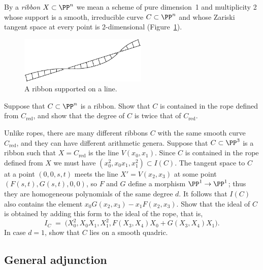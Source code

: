 \begin{definition}
By a \emph{ribbon} $X \subset \PP^n$ we mean a scheme of pure dimension~1
%
and multiplicity 2 whose support is a smooth, irreducible curve $C \subset
\PP^n$ and whose 
Zariski tangent space
%
 at every point is 2-dimensional
(Figure~\ref{Fig15.3}).
\begin{figure}
\vskip-5pt
\centerline {\includegraphics[width=2.4in]{"main/Fig15-3"}}
\vskip-8pt
\caption{A ribbon supported on a line.}
\label{Fig15.3}
\end{figure}
\end{definition}

\begin{exercise}
Suppose that $C\subset \PP^n$ is a ribbon. Show that $C$ is
contained in the rope defined from $C_{\mathrm{red}}$, and show that
the degree of $C$ is twice 
that
of $C_{\mathrm{red}}$.
\end{exercise}

\begin{exercise}
Unlike ropes, there are many different ribbons $C$ with the same smooth
curve $C_{\mathrm{red}}$,
and they can have different 
arithmetic genera.
%
Suppose that $C\subset \PP^3$ is a ribbon such that $X = C_{\mathrm{red}}$
is the line $V(x_0,x_1)$.
Since $C$ is contained in the rope defined from $X$ we must have
$(x_0^2, x_0x_1,x_1^2) \subset I(C)$. The tangent space to $C$ at a
point $(0,0,s,t)$ meets the line $X' = V(x_2, x_3)$
at some point $(F(s,t),G(s,t),0,0)$, so $F$ and $G$ define a morphism
$\PP^1 \to \PP^1$;
thus they are homogeneous polynomials of the same degree $d$. It follows
that $I(C)$ also contains the element
$x_0 G(x_2, x_3) - x_1F(x_2,x_3)$. Show that the ideal of $C$ is obtained
by adding this form to the ideal of the rope, that is,
$$
I_C \; = \; \big(X_0^2, X_0X_1, X_1^2, F(X_3,X_4)X_0 + G(X_3,X_4)X_1\big)
.
$$
In case $d=1$, show that $C$ lies on a smooth quadric.
\end{exercise}

\subsection*{General adjunction}

